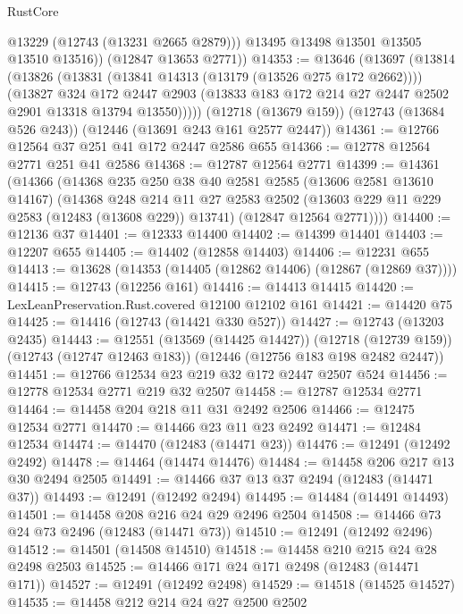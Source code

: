 \begin{lexlean}{RustCore}
\begin{coremodule}
            @13229
            (@12743 (@13231 @2665 @2879)))
          @13495
          @13498
          @13501
          @13505
          @13510
          @13516))
      (@12847 @13653 @2771))
@14353 := @13646
    (@13697
      (@13814
        (@13826
          (@13831 (@13841 @14313 (@13179 (@13526 @275 @172 @2662))))
          (@13827
            @324
            @172
            @2447
            @2903
            (@13833 @183 @172 @214 @27 @2447 @2502 @2901 @13318 @13794 @13550)))))
    (@12718 (@13679 @159))
    (@12743 (@13684 @526 @243))
    (@12446 (@13691 @243 @161 @2577 @2447))
@14361 := @12766 @12564 @37 @251 @41 @172 @2447 @2586 @655
@14366 := @12778 @12564 @2771 @251 @41 @2586
@14368 := @12787 @12564 @2771
@14399 := @14361
    (@14366
      (@14368
        @235
        @250
        @38
        @40
        @2581
        @2585
        (@13606 @2581 @13610 @14167)
        (@14368
          @248
          @214
          @11
          @27
          @2583
          @2502
          (@13603 @229 @11 @229 @2583 (@12483 (@13608 @229)) @13741)
          (@12847 @12564 @2771))))
@14400 := @12136 @37
@14401 := @12333 @14400
@14402 := @14399 @14401
@14403 := @12207 @655
@14405 := @14402 (@12858 @14403)
@14406 := @12231 @655
@14413 := @13628 (@14353 (@14405 (@12862 @14406) (@12867 (@12869 @37))))
@14415 := @12743 (@12256 @161)
@14416 := @14413 @14415
@14420 := LexLeanPreservation.Rust.covered @12100 @12102 @161
@14421 := @14420 @75
@14425 := @14416 (@12743 (@14421 @330 @527))
@14427 := @12743 (@13203 @2435)
@14443 := @12551
    (@13569 (@14425 @14427))
    (@12718 (@12739 @159))
    (@12743 (@12747 @12463 @183))
    (@12446 (@12756 @183 @198 @2482 @2447))
@14451 := @12766 @12534 @23 @219 @32 @172 @2447 @2507 @524
@14456 := @12778 @12534 @2771 @219 @32 @2507
@14458 := @12787 @12534 @2771
@14464 := @14458 @204 @218 @11 @31 @2492 @2506
@14466 := @12475 @12534 @2771
@14470 := @14466 @23 @11 @23 @2492
@14471 := @12484 @12534
@14474 := @14470 (@12483 (@14471 @23))
@14476 := @12491 (@12492 @2492)
@14478 := @14464 (@14474 @14476)
@14484 := @14458 @206 @217 @13 @30 @2494 @2505
@14491 := @14466 @37 @13 @37 @2494 (@12483 (@14471 @37))
@14493 := @12491 (@12492 @2494)
@14495 := @14484 (@14491 @14493)
@14501 := @14458 @208 @216 @24 @29 @2496 @2504
@14508 := @14466 @73 @24 @73 @2496 (@12483 (@14471 @73))
@14510 := @12491 (@12492 @2496)
@14512 := @14501 (@14508 @14510)
@14518 := @14458 @210 @215 @24 @28 @2498 @2503
@14525 := @14466 @171 @24 @171 @2498 (@12483 (@14471 @171))
@14527 := @12491 (@12492 @2498)
@14529 := @14518 (@14525 @14527)
@14535 := @14458 @212 @214 @24 @27 @2500 @2502

\end{coremodule}
\end{lexlean}
